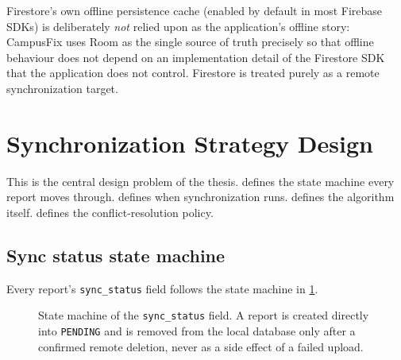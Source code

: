 Firestore's own offline persistence cache (enabled by default in most
Firebase SDKs) is deliberately \emph{not} relied upon as the
application's offline story: CampusFix uses Room as the single source of
truth precisely so that offline behaviour does not depend on an
implementation detail of the Firestore SDK that the application does not
control. Firestore is treated purely as a remote synchronization target.

\section{Synchronization Strategy Design}
\label{sec:sync-design}

This is the central design problem of the thesis. 
defines the state machine every report moves through.
 defines when synchronization runs.
 defines the algorithm itself.
 defines the conflict-resolution policy.

\subsection{Sync status state machine}
\label{sec:sync-statuses}

Every report's \texttt{sync\_status} field follows the state machine in
\cref{fig:sync-state-machine}.

\begin{figure}[htbp]
  \centering
  \caption{State machine of the \texttt{sync\_status} field. A report is
  created directly into \texttt{PENDING} and is removed from the local
  database only after a confirmed remote deletion, never as a side effect
  of a failed upload.}
  \label{fig:sync-state-machine}
\end{figure}

